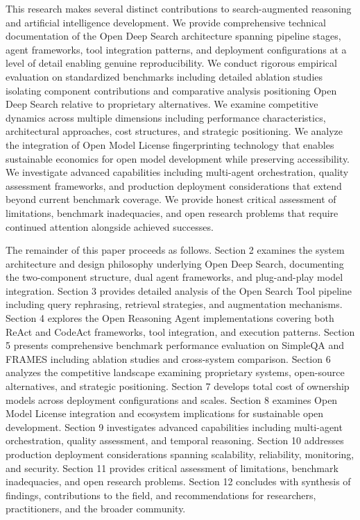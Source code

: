 This research makes several distinct contributions to search-augmented reasoning and artificial intelligence development. We provide comprehensive technical documentation of the Open Deep Search architecture spanning pipeline stages, agent frameworks, tool integration patterns, and deployment configurations at a level of detail enabling genuine reproducibility. We conduct rigorous empirical evaluation on standardized benchmarks including detailed ablation studies isolating component contributions and comparative analysis positioning Open Deep Search relative to proprietary alternatives. We examine competitive dynamics across multiple dimensions including performance characteristics, architectural approaches, cost structures, and strategic positioning. We analyze the integration of Open Model License fingerprinting technology that enables sustainable economics for open model development while preserving accessibility. We investigate advanced capabilities including multi-agent orchestration, quality assessment frameworks, and production deployment considerations that extend beyond current benchmark coverage. We provide honest critical assessment of limitations, benchmark inadequacies, and open research problems that require continued attention alongside achieved successes.

The remainder of this paper proceeds as follows. Section 2 examines the system architecture and design philosophy underlying Open Deep Search, documenting the two-component structure, dual agent frameworks, and plug-and-play model integration. Section 3 provides detailed analysis of the Open Search Tool pipeline including query rephrasing, retrieval strategies, and augmentation mechanisms. Section 4 explores the Open Reasoning Agent implementations covering both ReAct and CodeAct frameworks, tool integration, and execution patterns. Section 5 presents comprehensive benchmark performance evaluation on SimpleQA and FRAMES including ablation studies and cross-system comparison. Section 6 analyzes the competitive landscape examining proprietary systems, open-source alternatives, and strategic positioning. Section 7 develops total cost of ownership models across deployment configurations and scales. Section 8 examines Open Model License integration and ecosystem implications for sustainable open development. Section 9 investigates advanced capabilities including multi-agent orchestration, quality assessment, and temporal reasoning. Section 10 addresses production deployment considerations spanning scalability, reliability, monitoring, and security. Section 11 provides critical assessment of limitations, benchmark inadequacies, and open research problems. Section 12 concludes with synthesis of findings, contributions to the field, and recommendations for researchers, practitioners, and the broader community.

